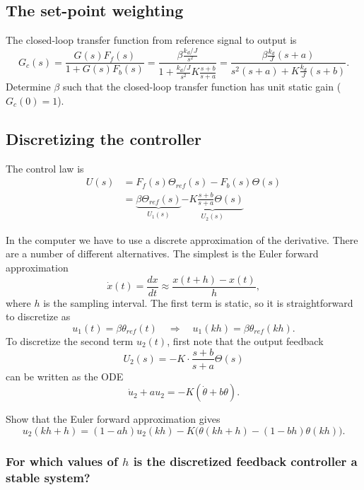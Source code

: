 \documentclass[a4paper]{scrartcl}
\begin{document}
\subsection*{The set-point weighting}
\label{sec-1-8}
The closed-loop transfer function from reference signal to output is 
\[ G_c(s) = \frac{G(s)F_f(s)}{1 + G(s)F_b(s)} = \frac{\beta \frac{k_d/J}{s^2}}{ 1 + \frac{k_d/J}{s^2} K \frac{s+b}{s+a}} = \frac{\beta \frac{k_d}{J} (s+a)}{s^2(s+a) + K\frac{k_d}{J}(s+b)}.\]
Determine $\beta$ such that the closed-loop transfer function has unit static gain (\(G_c(0)=1\)).

\subsection*{Discretizing the controller}
\label{sec-1-9}
The control law is 
\begin{align*} 
U(s) &= F_f(s)\Theta_{ref}(s) - F_b(s)\Theta(s)\\
 &= \underbrace{\beta\Theta_{ref}(s)}_{U_1(s)} \underbrace{-K\frac{s + b}{s+a} \Theta(s)}_{U_2(s)}
\end{align*}

In the computer we have to use a discrete approximation of the derivative. There are a number of different alternatives. The simplest is the Euler forward approximation
$$ \dot{x}(t) = \frac{dx}{dt} \approx \frac{x(t+h) - x(t)}{h}, $$
where $h$ is the sampling interval. The first term is static, so it is straightforward to discretize as
$$ u_1(t) = \beta \theta_{ref}(t) \quad \Rightarrow \quad u_1(kh) = \beta \theta_{ref}(kh). $$
To discretize the second term $u_2(t)$, first note that the output feedback 
\[U_2(s) = -K \cdot \frac{s + b}{s + a} \Theta(s)\]
can be written as the ODE 
$$\dot{u}_2 + a u_2 = - K (\dot{\theta} + b \theta).$$

\vspace*{2cm}

Show that the Euler forward approximation gives 
$$ u_2(kh+h) = ( 1 - ah) u_2(kh) - K \Big(\theta(kh+h) - (1-bh)\theta(kh)\Big). $$

\subsubsection*{For which values of $h$ is the discretized feedback controller a stable system?}
\label{sec-1-9-1}
\end{document}
